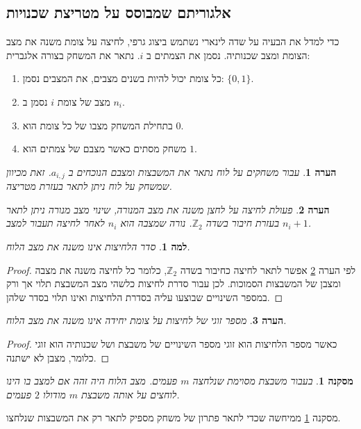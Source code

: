 \documentclass[12pt,leqno]{article}
\theoremstyle{theoremdd}
\newtheorem{corollary}{מסקנה}[section]
\newtheorem{lemma}{למה}[section]
\newtheorem{comm}{הערה}[section]
\begin{document}
\subsection{אלגוריתם שמבוסס על מטריצת שכנויות}
כדי למדל את הבעיה על שדה לינארי
נשתמש ביצוג גרפי, לחיצה על צומת משנה את מצב הצומת ומצב שכנותיה.
נסמן את הצמתים ב
$i$.
נתאר את המשחק בצורה אלגברית:
\begin{enumerate}
    \item 
כל צומת יכול להיות בשנים מצבים,
את המצבים נסמן:
    $\{0,1\}$.
    \item 
מצב של צומת 
    $i$
נסמן ב
    $n_i$.
    \item 
    בתחילת המשחק מצבו של כל צומת הוא 
    $0$.
    \item 
    משחק מסתים כאשר מצבם של צמתים 
    הוא 
    $1$.
\end{enumerate}
\begin{comm}
    עבור משחקים על לוח נתאר את המשבצות ומצבם הנוכחים ב
    $a_{i,j}$.
    זאת מכיוון שמשחק על לוח ניתן לתאר בעזרת מטריצה.
\end{comm}
\begin{comm}
\label{comm: sum as press operator on board}
פעולת לחיצה על לחצן משנה 
את מצב המנורה,
שינוי מצב מנורה ניתן לתאר בעזרת חיבור בשדה 
$\mathbb{Z}_2$.
נורה שמצבה הוא
$n_i$
לאחר לחיצה תעבור למצב
$n_i + 1$.
\end{comm}
\begin{lemma}
    \label{lemma: order presses}
    סדר הלחיצות אינו משנה את מצב הלוח.
\end{lemma}
\begin{proof}
    לפי הערה
    \ref{comm: sum as press operator on board}
    אפשר לתאר לחיצה כחיבור
    בשדה
    $\mathbb{Z}_2$,
    כלומר כל לחיצה 
    משנה את מצבה ומצבן של המשבצות הסמוכות.
    לכן עבור סדרת לחיצות כלשהי מצב המשבצת
    תלוי אך ורק במספר השינויים שבוצעו עליה בסדרת הלחיצות
    ואינו תלוי בסדר שלהן. 
\end{proof}
\begin{comm}
    מספר זוגי של לחיצות על צומת יחידה אינו משנה את מצב הלוח.
\end{comm}
\begin{proof}
    כאשר מספר הלחיצות הוא זוגי מספר השינויים של משבצת
    ושל שכנותיה הוא זוגי כלומר, מצבן לא ישתנה.
\end{proof}
\begin{corollary}
    \label{corollary:gamplay-desc-single-press-key}
    בעבור משבצת מסוימת שנלחצה 
    $m$
    פעמים.
    מצב הלוח
    היה זהה אם 
    למצב בו הינו לוחצים 
    על אותה משבצת
    $m$
    מודולו
    $2$
    פעמים.
\end{corollary}
מסקנה
\ref{corollary:gamplay-desc-single-press-key}
ממיחשה 
שכדי לתאר פתרון של משחק מספיק לתאר רק את המשבצות שנלחצו.
\end{document}
